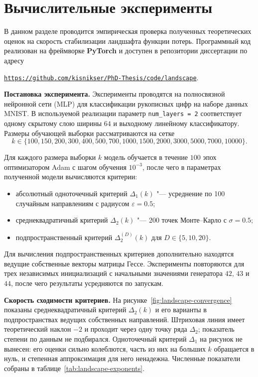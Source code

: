 \section{Вычислительные эксперименты}

В данном разделе проводится эмпирическая проверка полученных теоретических оценок на скорость стабилизации ландшафта функции потерь. Программный код реализован на фреймворке \textbf{PyTorch} и доступен в репозитории диссертации по адресу
\begin{center}
    \href{https://github.com/kisnikser/PhD-Thesis/tree/main/code/landscape}{\texttt{https://github.com/kisnikser/PhD-Thesis/code/landscape}}.
\end{center}

\textbf{Постановка эксперимента.} Эксперименты проводятся на полносвязной нейронной сети (MLP) для классификации рукописных цифр на наборе данных MNIST. В используемой реализации параметр \texttt{num\_layers = 2} соответствует одному скрытому слою ширины $64$ и выходному линейному классификатору. Размеры обучающей выборки рассматриваются на сетке
\[
k \in \{100, 150, 200, 300, 400, 500, 700, 1000, 1500, 2000, 3000, 5000, 7000, 10000\}.
\]

Для каждого размера выборки $k$ модель обучается в течение $100$ эпох оптимизатором Adam с шагом обучения $10^{-3}$, после чего в параметрах полученной модели вычисляются критерии:
\begin{itemize}
    \item абсолютный одноточечный критерий $\Delta_1(k)$ "--- усреднение по 100 случайным направлениям с радиусом $\varepsilon = 0.5$;
    \item среднеквадратичный критерий $\Delta_2(k)$ "--- 200 точек Монте--Карло с $\sigma = 0.5$;
    \item подпространственный критерий $\Delta_2^{(D)}(k)$ для $D \in \{5, 10, 20\}$.
\end{itemize}

Для вычисления подпространственных критериев дополнительно находятся ведущие собственные векторы матрицы Гессе. Эксперименты повторяются для трех независимых инициализаций с начальными значениями генератора $42$, $43$ и $44$, после чего результаты усредняются по запускам.

\textbf{Скорость сходимости критериев.} На рисунке~\ref{fig:landscape-convergence} показаны среднеквадратичный критерий $\Delta_2(k)$ и его варианты в подпространствах ведущих собственных направлений. Штриховая линия имеет теоретический наклон $-2$ и проходит через одну точку ряда $\Delta_2$; показатель степени по данным не подбирался. Одноточечный критерий $\Delta_1$ на рисунок не вынесен: его оценки сильно колеблются, часть из них на больших $k$ обращается в нуль, и степенная аппроксимация для него ненадежна. Численные показатели собраны в таблице~\ref{tab:landscape-exponents}.


